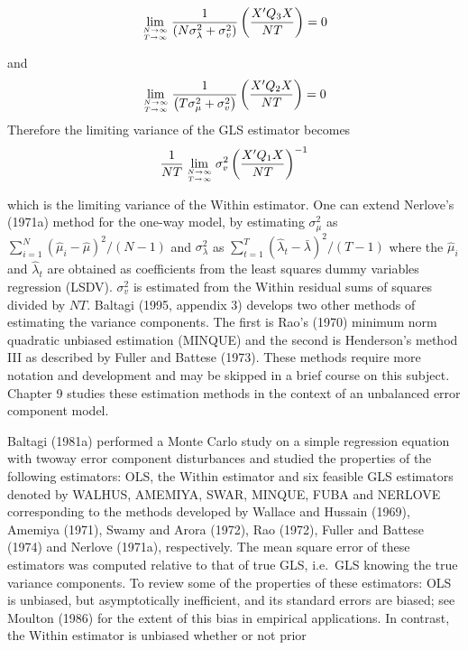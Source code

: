 \documentclass[
]{book}
\begin{document}
\[
\lim _{N \rightarrow \infty \atop T \rightarrow \infty} \frac{1}{\left(N \sigma_{\lambda}^{2}+\sigma_{v}^{2}\right)}\left(\frac{X^{\prime} Q_{3} X}{N T}\right)=0
\]

and
\[
\lim _{N \rightarrow \infty \atop T \rightarrow \infty} \frac{1}{\left(T \sigma_{\mu}^{2}+\sigma_{v}^{2}\right)}\left(\frac{X^{\prime} Q_{2} X}{N T}\right)=0
\]
Therefore the limiting variance of the GLS estimator becomes
\[
\frac{1}{N T} \lim _{N \rightarrow \infty \atop T \rightarrow \infty} \sigma_{v}^{2}\left(\frac{X^{\prime} Q_{1} X}{N T}\right)^{-1}
\]

which is the limiting variance of the Within estimator. One can extend Nerlove's (1971a) method for the one-way model, by estimating \(\sigma_{\mu}^{2}\) as \(\sum_{i=1}^{N}\left(\widehat{\mu}_{i}-\widehat{\mu}\right)^{2} /(N-1)\) and \(\sigma_{\lambda}^{2}\) as \(\sum_{t=1}^{T}\left(\widehat{\lambda}_{t}-\bar{\lambda}\right)^{2} /(T-1)\) where the \(\widehat{\mu}_{i}\) and \(\widehat{\lambda}_{t}\) are obtained
as coefficients from the least squares dummy variables regression (LSDV). \(\sigma_{v}^{2}\) is estimated from the Within residual sums of squares divided by \(N T\). Baltagi (1995, appendix 3) develops two other methods of estimating the variance components. The first is Rao's (1970) minimum norm quadratic unbiased estimation (MINQUE) and the second is Henderson's method III as described by Fuller and Battese (1973). These methods require more notation and development and may be skipped in a brief course on this subject. Chapter 9 studies these estimation methods in the context of an unbalanced error component model.

Baltagi (1981a) performed a Monte Carlo study on a simple regression equation with twoway error component disturbances and studied the properties of the following estimators:
OLS, the Within estimator and six feasible GLS estimators denoted by WALHUS, AMEMIYA, SWAR, MINQUE, FUBA and NERLOVE corresponding to the methods developed by Wallace and Hussain (1969), Amemiya (1971), Swamy and Arora (1972), Rao (1972), Fuller and Battese (1974) and Nerlove (1971a), respectively. The mean square error of these estimators was computed relative to that of true GLS, i.e.~GLS knowing the true variance components. To review some of the properties of these estimators: OLS is unbiased, but asymptotically inefficient, and its standard errors are biased; see Moulton (1986) for the extent of this bias in empirical applications. In contrast, the Within estimator is unbiased whether or not prior
\end{document}
